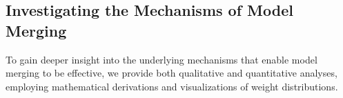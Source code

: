 

\subsection{Investigating the Mechanisms of Model Merging}
\label{subsec:merging_mechanisms}

To gain deeper insight into the underlying mechanisms that enable model merging to be effective, we provide both qualitative and quantitative analyses, employing mathematical derivations and visualizations of weight distributions.

